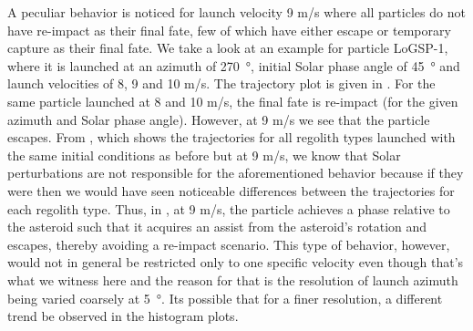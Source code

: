 A peculiar behavior is noticed for launch velocity 9 m/s where all particles do not have re-impact as their final fate, few of which have either escape or temporary capture as their final fate. We take a look at an example for particle LoGSP-1, where it is launched at an azimuth of \SI{270}{\degree}, initial Solar phase angle of \SI{45}{\degree} and launch velocities of 8, 9 and 10 m/s. The trajectory plot is given in . For the same particle launched at 8 and 10 m/s, the final fate is re-impact (for the given azimuth and Solar phase angle). However, at 9 m/s we see that the particle escapes. From , which shows the trajectories for all regolith types launched with the same initial conditions as before but at 9 m/s, we know that Solar perturbations are not responsible for the aforementioned behavior because if they were then we would have seen noticeable differences between the trajectories for each regolith type. Thus, in , at 9 m/s, the particle achieves a phase relative to the asteroid such that it acquires an assist from the asteroid's rotation and escapes, thereby avoiding a re-impact scenario. This type of behavior, however, would not in general be restricted only to one specific velocity even though that's what we witness here and the reason for that is the resolution of launch azimuth being varied coarsely at \SI{5}{\degree}. Its possible that for a finer resolution, a different trend be observed in the histogram plots.
